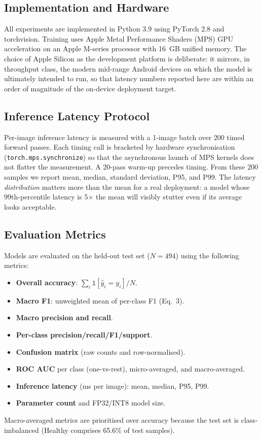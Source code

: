 \documentclass[conference,10pt]{IEEEtran}
\begin{document}
\subsection{Implementation and Hardware}

All experiments are implemented in Python 3.9 using PyTorch 2.8 and
torchvision. Training uses Apple Metal Performance Shaders (MPS) GPU
acceleration on an Apple M-series processor with 16~GB unified memory. The
choice of Apple Silicon as the development platform is deliberate: it
mirrors, in throughput class, the modern mid-range Android devices on which
the model is ultimately intended to run, so that latency numbers reported
here are within an order of magnitude of the on-device deployment target.

\subsection{Inference Latency Protocol}

Per-image inference latency is measured with a 1-image batch over 200 timed
forward passes. Each timing call is bracketed by hardware synchronisation
(\texttt{torch.mps.synchronize}) so that the asynchronous launch of MPS
kernels does not flatter the measurement. A 20-pass warm-up precedes timing.
From these 200 samples we report mean, median, standard deviation, P95, and
P99. The latency \emph{distribution} matters more than the mean for a real
deployment: a model whose 99th-percentile latency is 5$\times$ the mean will
visibly stutter even if its average looks acceptable.

\subsection{Evaluation Metrics}

Models are evaluated on the held-out test set ($N=494$) using the following
metrics:
\begin{itemize}
\item \textbf{Overall accuracy}: $\sum_i\mathbb{1}[\hat{y}_i=y_i]/N$.
\item \textbf{Macro F1}: unweighted mean of per-class F1 (Eq.~3).
\item \textbf{Macro precision and recall}.
\item \textbf{Per-class precision/recall/F1/support}.
\item \textbf{Confusion matrix} (raw counts and row-normalised).
\item \textbf{ROC AUC} per class (one-vs-rest), micro-averaged, and
macro-averaged.
\item \textbf{Inference latency} (ms per image): mean, median, P95, P99.
\item \textbf{Parameter count} and FP32/INT8 model size.
\end{itemize}
Macro-averaged metrics are prioritised over accuracy because the test set is
class-imbalanced (Healthy comprises 65.6\% of test samples).
\end{document}
